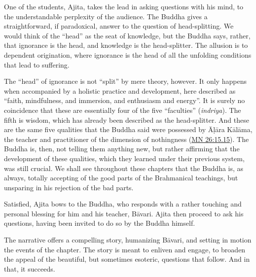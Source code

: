 \documentclass[12pt,openany]{book}%
\begin{document}
One of the students, Ajita, takes the lead in asking questions with his mind, to the understandable perplexity of the audience. The Buddha gives a straightforward, if paradoxical, answer to the question of head-splitting. We would think of the “head” as the seat of knowledge, but the Buddha says, rather, that ignorance is the head, and knowledge is the head-splitter. The allusion is to dependent origination, where ignorance is the head of all the unfolding conditions that lead to suffering.

The “head” of ignorance is not “split” by mere theory, however. It only happens when accompanied by a holistic practice and development, here described as “faith, mindfulness, and immersion, and enthusiasm and energy”. It is surely no coincidence that these are essentially four of the five “faculties” (\textit{indriya}). The fifth is wisdom, which has already been described as the head-splitter. And these are the same five qualities that the Buddha said were possessed by \textsanskrit{Āḷāra} \textsanskrit{Kālāma}, the teacher and practitioner of the dimension of nothingness (\href{https://suttacentral.net/mn26/en/sujato\#15.15}{MN 26:15.15}). The Buddha is, then, not telling them anything new, but rather affirming that the development of these qualities, which they learned under their previous system, was still crucial. We shall see throughout these chapters that the Buddha is, as always, totally accepting of the good parts of the Brahmanical teachings, but unsparing in his rejection of the bad parts.

Satisfied, Ajita bows to the Buddha, who responds with a rather touching and personal blessing for him and his teacher, \textsanskrit{Bāvari}. Ajita then proceed to ask his questions, having been invited to do so by the Buddha himself.

The narrative offers a compelling story, humanizing \textsanskrit{Bāvari}, and setting in motion the events of the chapter. The story is meant to enliven and engage, to broaden the appeal of the beautiful, but sometimes esoteric, questions that follow. And in that, it succeeds.
\end{document}
